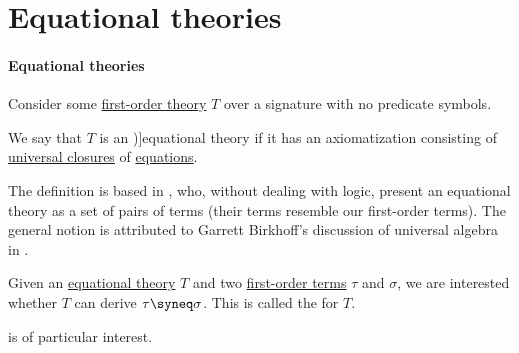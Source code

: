 \section{Equational theories}\label{sec:equational_theories}

\paragraph{Equational theories}

\begin{definition}\label{def:fol_equational_theory}\mimprovised
  Consider some \hyperref[def:fol_theory]{first-order theory} \( T \) over a signature with no predicate symbols.

  We say that \( T \) is an \term[en=equational theory (\cite[def. 3.5.3]{BaaderNipkow2012TermRewriting})]{equational theory} if it has an axiomatization consisting of \hyperref[def:fol_quantifier_closure]{universal closures} of \hyperref[def:fol_equation]{equations}.
\end{definition}
\begin{comments}
  \item The definition is based in \cite[def. 3.5.3]{BaaderNipkow2012TermRewriting}, who, without dealing with logic, present an equational theory as a set of pairs of terms (their terms resemble our first-order terms). The general notion is attributed to Garrett Birkhoff's discussion of universal algebra in \cite[ch. VI]{Birkhoff1967LatticeTheory}.
\end{comments}

\begin{problem}\label{prob:fol_word_problem}
  Given an \hyperref[def:fol_equational_theory]{equational theory} \( T \) and two \hyperref[def:fol_term]{first-order terms} \( \tau \) and \( \sigma \), we are interested whether \( T \) can derive \( \tau \syneq \sigma \). This is called the  for \( T \).
\end{problem}
\begin{comments}
  \item {} is of particular interest.
\end{comments}

